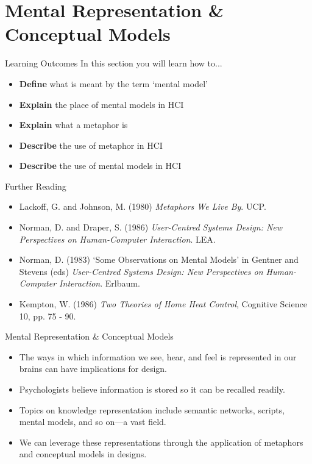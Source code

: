 \part{Mental Representation \& Conceptual Models}
\frame{\partpage}

\begin{frame}{Learning Outcomes}
	In this section you will learn how to...
	
	\begin{itemize}
		\item \textbf{Define} what is meant by the term `mental model'
		\item \textbf{Explain} the place of mental models in HCI
		\item \textbf{Explain} what a metaphor is
		\item \textbf{Describe} the use of metaphor in HCI
		\item \textbf{Describe} the use of mental models in HCI
	\end{itemize}
\end{frame}

\begin{frame}{Further Reading}
	\begin{itemize}
		\item Lackoff, G. and Johnson, M. (1980) \textit{Metaphors We Live By}. UCP.
		\item Norman, D. and Draper, S. (1986) \textit{User-Centred Systems Design: New Perspectives on Human-Computer Interaction}. LEA.
		\item Norman, D. (1983) `Some Observations on Mental Models' in Gentner and Stevens (eds) \textit{User-Centred Systems Design: New Perspectives on Human-Computer
		 Interaction}. Erlbaum.
		 \item Kempton, W. (1986) \textit{Two Theories of Home Heat Control}, Cognitive Science 10, pp. 75 - 90.
	\end{itemize}
\end{frame}

\begin{frame}{Mental Representation \& Conceptual Models}
	\begin{itemize}
		\item The ways in which information we see, hear, and feel is represented in our brains can have implications for design.
		\item Psychologists believe information is stored so it can be recalled readily.
		\item Topics on knowledge representation include semantic networks, scripts, mental models, and so on---a vast field.
		\item We can leverage these representations through the application of metaphors and conceptual models in designs.
	\end{itemize}
\end{frame}


